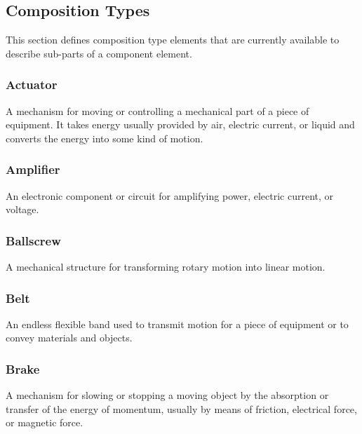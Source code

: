 \subsection{Composition Types} \label{sec:CompositionTypes}

This section defines \gls{composition} type elements that are currently available to describe sub-parts of a \gls{component} element.


\subsubsection{Actuator}
  \label{sec:Actuator}


A mechanism for moving or controlling a mechanical part of a piece of equipment.   
 It takes energy usually provided by air, electric current, or liquid and converts the energy into some kind of motion. 

\FloatBarrier

\subsubsection{Amplifier}
  \label{sec:Amplifier}


An electronic component or circuit for amplifying power, electric current, or voltage.

\FloatBarrier

\subsubsection{Ballscrew}
  \label{sec:Ballscrew}


A mechanical structure for transforming rotary motion into linear motion.

\FloatBarrier

\subsubsection{Belt}
  \label{sec:Belt}


An endless flexible band used to transmit motion for a piece of equipment or to convey materials and objects.

\FloatBarrier

\subsubsection{Brake}
  \label{sec:Brake}


A mechanism for slowing or stopping a moving object by the absorption or transfer of the energy of momentum, usually by means of friction, electrical force, or magnetic force.

